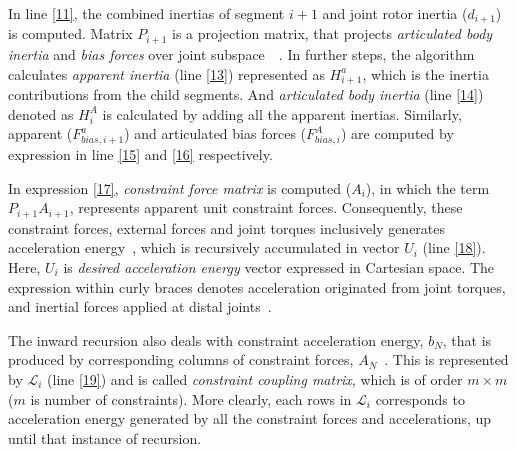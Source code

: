 In line \ref{11}, the combined inertias of segment $i+1$ and joint rotor inertia ($d_{i+1}$) is computed. Matrix $P_{i+1}$ is a projection matrix, that projects \textit{articulated body inertia} and \textit{bias forces} over joint subspace~\cite{shakhimardanov2015composable}~\cite{vukcevic2018extending}. In further steps, the algorithm calculates \textit{apparent inertia} (line \ref{13}) represented as $H^a_{i+1}$, which is the inertia contributions from the child segments. And \textit{articulated body inertia} (line \ref{14}) denoted as $H^A_{i}$ is calculated by adding all the apparent inertias. Similarly, apparent ($F^a_{bias, i+1}$) and articulated bias forces ($F^A_{bias, i}$) are computed by expression in line \ref{15} and \ref{16} respectively.

In expression \ref{17}, \textit{constraint force matrix} is computed ($A_i$), in which the term $P_{i+1} A_{i+1}$, represents apparent unit constraint forces. Consequently, these constraint forces, external forces and joint torques inclusively generates acceleration energy~\cite{shakhimardanov2015composable}, which is recursively accumulated in vector $U_i$ (line \ref{18}). Here, $U_i$ is \textit{desired acceleration energy} vector expressed in Cartesian space. The expression within curly braces denotes acceleration originated from joint torques, and inertial forces applied at distal joints~\cite{shakhimardanov2015composable}.

The inward recursion also deals with constraint acceleration energy, $b_N$, that is produced by corresponding columns of constraint forces, $A_N$~\cite{shakhimardanov2015composable}. This is represented by $\mathcal{L}_i$ (line \ref{19}) and is called \textit{constraint coupling matrix}, which is of order $m \times m$ ($m$ is number of constraints). More clearly, each rows in $\mathcal{L}_i$ corresponds to acceleration energy generated by all the constraint forces and accelerations, up until that instance of recursion.


